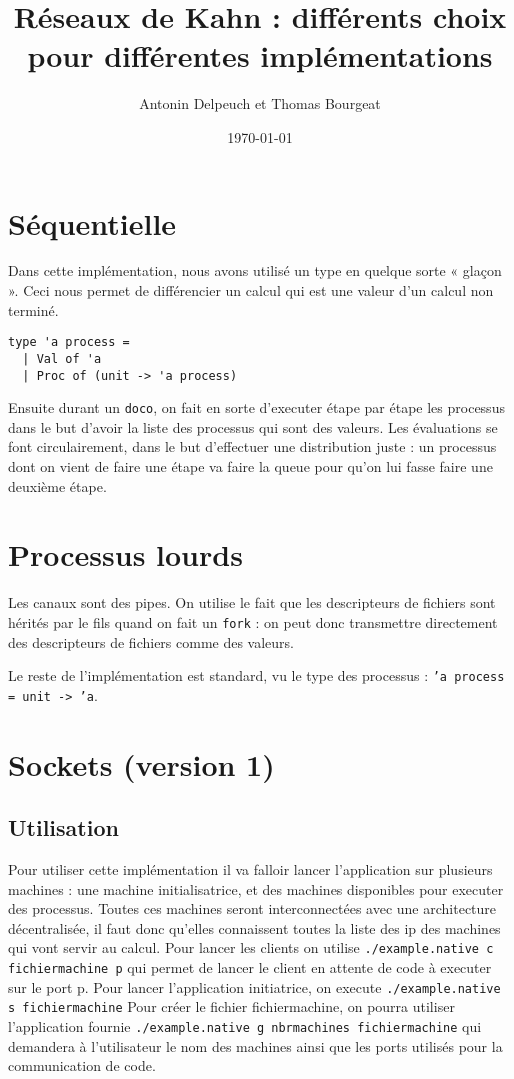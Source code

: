 \documentclass[a4paper]{article}
\begin{document}
\title{Réseaux de Kahn : différents choix pour différentes
implémentations }
\author{Antonin Delpeuch et Thomas Bourgeat}
\date{\today}

\maketitle

\section{Séquentielle}
Dans cette implémentation, nous avons utilisé un type en quelque sorte « glaçon ». Ceci
nous permet de différencier un calcul qui est une valeur d'un calcul
non terminé.

\begin{verbatim}
type 'a process =
  | Val of 'a
  | Proc of (unit -> 'a process)
\end{verbatim}

Ensuite durant un \texttt{doco}, on fait en sorte d'executer étape par étape les
processus dans le but d'avoir la liste des processus qui sont des
valeurs. Les évaluations se font circulairement, dans le but d'effectuer
une distribution juste : un processus dont on vient de faire une
étape va faire la queue pour qu'on lui fasse faire une deuxième étape.
 

\section{Processus lourds}

Les canaux sont des pipes. On utilise le fait que les descripteurs de fichiers
sont hérités par le fils quand on fait un \texttt{fork} : on peut donc transmettre
directement des descripteurs de fichiers comme des valeurs.

Le reste de l'implémentation est standard, vu le type des processus : \texttt{'a process = unit -> 'a}.

\section{Sockets (version 1)}

\subsection{Utilisation}
Pour utiliser cette implémentation il va falloir lancer 
l'application sur plusieurs machines : une machine initialisatrice, et
des machines disponibles pour executer des processus. Toutes ces machines seront
interconnectées avec une architecture décentralisée, il faut donc
qu'elles connaissent toutes la liste des ip des machines qui vont servir
au calcul.
Pour lancer les clients on utilise \texttt{./example.native c
fichiermachine p} qui
permet de lancer le client en attente de code à executer sur le port p.
Pour lancer l'application initiatrice, on execute \texttt{./example.native s
fichiermachine}
Pour créer le fichier fichiermachine, on pourra utiliser l'application
fournie \texttt{./example.native g nbrmachines fichiermachine} qui demandera à
l'utilisateur le nom des machines ainsi que les ports utilisés pour la
communication de code.
\end{document}
